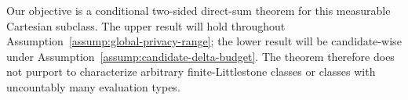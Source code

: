 Our objective is a conditional two-sided direct-sum theorem for this
measurable Cartesian subclass.  The upper result will hold throughout
Assumption~\ref{assump:global-privacy-range}; the lower result will be
candidate-wise under Assumption~\ref{assump:candidate-delta-budget}.
The theorem therefore does not purport to characterize arbitrary
finite-Littlestone classes or classes with uncountably many evaluation
types.

